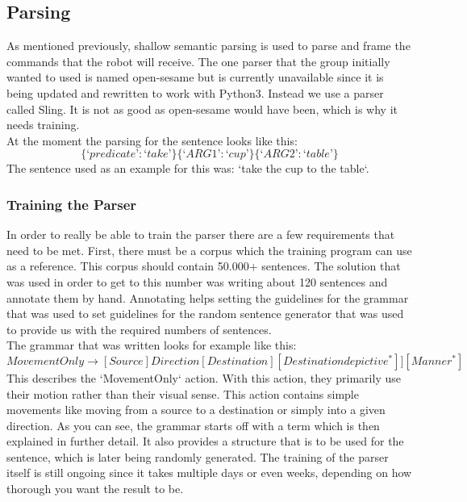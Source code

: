 \documentclass[main.tex]{subfiles}
\begin{document}
		
		\subsection{Parsing}
		As mentioned previously, shallow semantic parsing is used to parse and frame the commands that the robot will receive. The one parser that the group initially wanted to used is named open-sesame but is currently unavailable since it is being updated and rewritten to work with Python3. Instead we use a parser called Sling. It is not as good as open-sesame would have been, which is why it needs training.\\
		At the moment the parsing for the sentence looks like this:
		\begin{equation}
		\{‘predicate’: ‘take’\} \{‘ARG1’: ‘cup’\} \{‘ARG2’: ‘table’\}
		\end{equation}		
		The sentence used as an example for this was: ‘take the cup to the table‘.
		
		\subsubsection{Training the Parser}
		In order to really be able to train the parser there are a few requirements that need to be met. First, there must be a corpus which the training program can use as a reference. This corpus should contain 50.000+ sentences. The solution that was used in order to get to this number was writing about 120 sentences and annotate them by hand. Annotating helps setting the guidelines for the grammar that was used to set guidelines for the random sentence generator that was used to provide us with the required numbers of sentences.\\
		The grammar that was written looks for example like this:
		\begin{equation}
		MovementOnly \rightarrow [Source]Direction[Destination][Destinationdepictive^*]][Manner^*]
		\end{equation}		
		This describes the ‘MovementOnly‘ action. With this action, they primarily use their motion rather than their visual sense. This action contains simple movements like moving from a source to a destination or simply into a given direction.
		As you can see, the grammar starts off with a term which is then explained in further detail. It also provides a structure that is to be used for the sentence, which is later being randomly generated. The training of the parser itself is still ongoing since it takes multiple days or even weeks, depending on how thorough you want the result to be.
		
\end{document}
